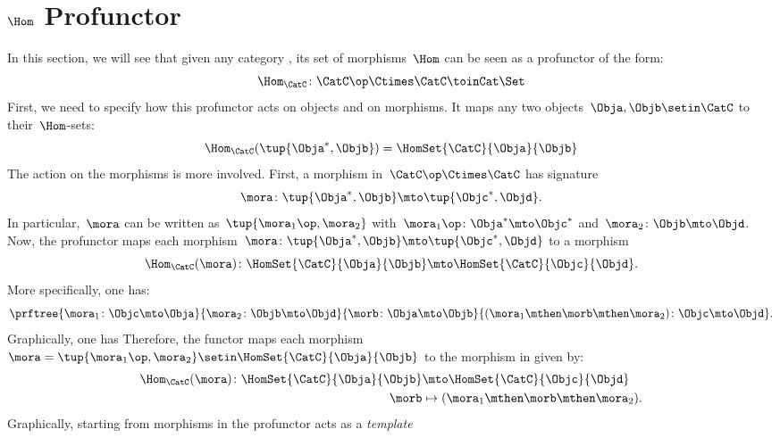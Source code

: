 
\section{$\Hom$ Profunctor}

In this section, we will see that given any category \CatC, its set of morphisms~$\Hom$ can be seen as a profunctor of the form:
\begin{equation}
    \label{eq:hom-signature}
    \Hom_\CatC\colon \CatC \op \Ctimes \CatC \toinCat \Set
\end{equation}
First, we need to specify how this profunctor acts on objects and on morphisms.
It maps any two objects~$\Obja,\Objb\setin \CatC$ to their~$\Hom$-sets:
\begin{equation}
    \label{eq:hom-action}
    \Hom_\CatC(\tup{\Obja^*,\Objb})=\HomSet{\CatC}{\Obja}{\Objb}
\end{equation}
The action on the morphisms is more involved.
First, a morphism in~$\CatC\op \Ctimes \CatC$ has signature
%
\begin{equation}
    \label{eq:hom0}
    \mora \colon \tup{\Obja^*,\Objb}\mto \tup{\Objc^*, \Objd}.
\end{equation}
%
In particular,~$\mora$ can be written as~$\tup{\mora_1\op,\mora_2}$ with~$\mora_1\op\colon \Obja^*\mto \Objc^*$ and~$\mora_2\colon \Objb\mto \Objd$.
Now, the profunctor maps each morphism~$\mora \colon \tup{\Obja^*,\Objb}\mto \tup{\Objc^*, \Objd}$ to a morphism
%
\begin{equation}
    \label{eq:hom2}
    \Hom_\CatC(\mora)\colon \HomSet{\CatC}{\Obja}{\Objb}\mto \HomSet{\CatC}{\Objc}{\Objd}.
\end{equation}
%
More specifically, one has:
%
\begin{equation}
    \label{eq:hom3}
    \prftree{
        \mora_1\colon \Objc \mto \Obja
    }{
        \mora_2\colon \Objb\mto \Objd
    }{
        \morb\colon \Obja\mto \Objb
    }{
        (\mora_1\mthen \morb \mthen \mora_2)\colon \Objc\mto \Objd
    }.
\end{equation}
%
Graphically, one has
%
Therefore, the functor maps each morphism~$\mora=\tup{\mora_1\op,\mora_2}\setin \HomSet{\CatC}{\Obja}{\Objb}$ to the morphism in \Set given by:
%
\begin{equation}
    \label{eq:hom4}
    \begin{aligned}
        \Hom_\CatC(\mora)\colon \HomSet{\CatC}{\Obja}{\Objb} & \mto \HomSet{\CatC}{\Objc}{\Objd} \\
        \morb                                                & \mapsto (\mora_1\mthen \morb \mthen \mora_2).
    \end{aligned}
\end{equation}
%
Graphically, starting from morphisms in \CatC
%
%
the profunctor acts as a \emph{template}
%

